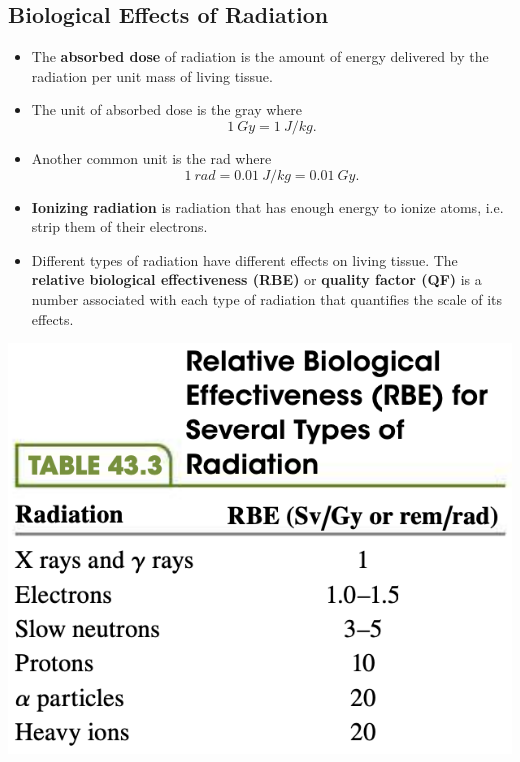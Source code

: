 \documentclass{article}
\begin{document}
\subsection{Biological Effects of Radiation}

\begin{itemize}
  \item The \textbf{absorbed dose} of radiation is the amount of energy delivered by the radiation per unit mass of living tissue.

  \item The unit of absorbed dose is the gray where \[\qty{1}{Gy} = \qty{1}{J/kg}.\]

  \item Another common unit is the rad where \[\qty{1}{rad} = \qty{0.01}{J/kg} = \qty{0.01}{Gy}.\]

  \item \textbf{Ionizing radiation} is radiation that has enough energy to ionize atoms, i.e. strip them of their electrons.

  \item Different types of radiation have different effects on living tissue. The \textbf{relative biological effectiveness (RBE)} or \textbf{quality factor (QF)} is a number associated with each type of radiation that quantifies the scale of its effects.
\end{itemize}

\begin{center}
  \includegraphics[scale=0.43]{rbe}
\end{center}
\end{document}
